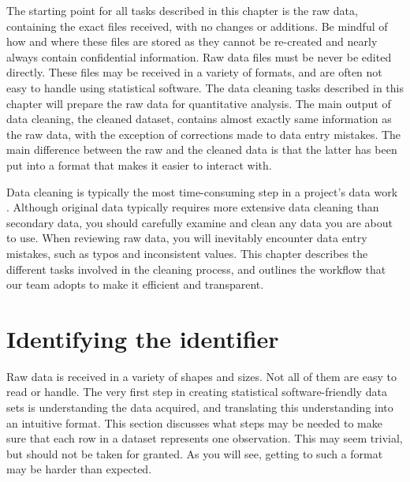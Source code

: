 
\begin{fullwidth}

The starting point for all tasks described in this chapter is the raw data,
containing the exact files received, with no changes or additions.
Be mindful of how and where these files are stored
as they cannot be re-created and nearly always contain confidential information.
Raw data files must be never be edited directly.
These files may be received in a variety of formats, 
and are often not easy to handle using statistical software.
The data cleaning tasks described in this chapter will prepare the raw data
for quantitative analysis.
The main output of data cleaning, the cleaned dataset,
contains almost exactly same information as the raw data,
with the exception of corrections made to data entry mistakes.
The main difference between the raw and the cleaned data is that the latter
has been put into a format that makes it easier to interact with. 

Data cleaning is typically the most time-consuming step in a project's data work \citep{dasu2003exploratory}.
Although original data typically requires more extensive data cleaning than secondary data,
you should carefully examine and clean any data you are about to use.
When reviewing raw data, you will inevitably encounter data entry mistakes,
such as typos and inconsistent values.
This chapter describes the different tasks involved in the cleaning process,
and outlines the workflow that our team adopts to make it efficient and transparent.

\end{fullwidth}


\section{Identifying the identifier}

Raw data is received in a variety of shapes and sizes.
Not all of them are easy to read or handle.
The very first step in creating statistical software-friendly data sets
is understanding the data acquired,
and translating this understanding into an intuitive format.
This section discusses what steps may be needed to make sure that each row
in a dataset represents one observation.
This may seem trivial, but should not be taken for granted.
As you will see, getting to such a format may be harder than expected.


